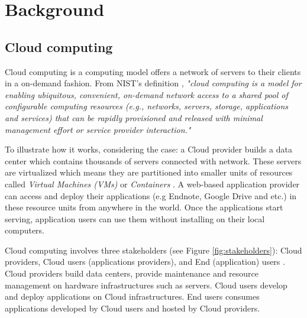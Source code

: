\section{Background}
\label{sec:background}
\subsection{Cloud computing}
Cloud computing is a computing model offers a network of servers to their clients in a on-demand fashion. From NIST's definition \cite{Mell:2011jj}, \textit{"cloud computing is a model for enabling ubiquitous, convenient, on-demand network access to a shared pool of configurable computing resources (e.g., networks, servers, storage, applications and services) that can be rapidly provisioned and released with minimal management effort or service provider interaction."}

To illustrate how it works, considering the case: a Cloud provider builds a data center which contains thousands of servers connected with network. These servers are virtualized which means they are partitioned into smaller units of resources called \emph{Virtual Machines (VMs)} or \emph{Containers} \cite{Felter:2015ki}. A web-based application provider can access and deploy their applications (e.g Endnote, Google Drive and etc.) in these resource units from anywhere in the world. Once the applications start serving, application users can use them without installing on their local computers.


Cloud computing involves three stakeholders (see Figure \ref{fig:stakeholders}): Cloud providers, Cloud users (applications providers), and End (application) users \cite{Jennings:2015ht}. Cloud providers build data centers, provide maintenance and resource management on hardware infrastructures such as servers. Cloud users develop and deploy applications on Cloud infrastructures. End users consumes applications developed by Cloud users and hosted by Cloud providers. 



